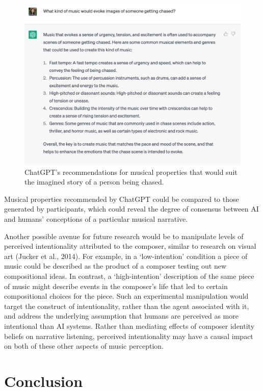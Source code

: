\documentclass[12pt,twoside]{reedthesis}
\begin{document}
\begin{figure}[h!tbp]
	\centering
	\includegraphics[scale=0.5]{chatgpt.png}
	\caption{ChatGPT's recommendations for musical properties that would suit the imagined story of a person being chased.}
	\label{fig-chatgpt}
\end{figure}

Musical properties recommended by ChatGPT could be compared to those generated by participants, which could reveal the degree of consensus between AI and humans' conceptions of a particular musical narrative. 

Another possible avenue for future research would be to manipulate levels of perceived intentionality attributed to the composer, similar to research on visual art (Jucker et al., 2014). For example, in a ‘low-intention’ condition a piece of music could be described as the product of a composer testing out new compositional ideas. In contrast, a ‘high-intention’ description of the same piece of music might describe events in the composer’s life that led to certain compositional choices for the piece. Such an experimental manipulation would target the construct of intentionality, rather than the agent associated with it, and address the underlying assumption that humans are perceived as more intentional than AI systems. Rather than mediating effects of composer identity beliefs on narrative listening, perceived intentionality may have a causal impact on both of these other aspects of music perception.

\section*{Conclusion}
\end{document}
